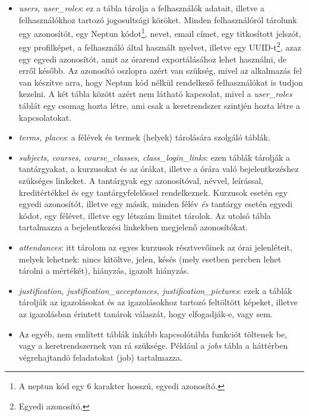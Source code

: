\documentclass[
]{thesis-ekf}
\theoremstyle{definition}
\theoremstyle{remark}
\begin{document}
\begin{itemize}
	\item \emph{users, user\_roles}: ez a tábla tárolja a felhasználók adatait, illetve a felhasználókhoz tartozó jogosultsági köröket. Minden felhasználóról tárolunk egy azonosítót, egy Neptun\cite{Neptun} kódot\footnote{A neptun kód egy 6 karakter hosszú, egyedi azonosító.}, nevet, email címet, egy titkosított jelszót, egy profilképet, a felhasználó által használt nyelvet, illetve egy UUID-t\footnote{Egyedi azonosító.\cite{uuid}}, azaz egy egyedi azonosítót, amit az órarend exportálásához lehet használni, de erről később. Az azonosító oszlopra azért van szükség, mivel az alkalmazás fel van készítve arra, hogy Neptun kód nélkül rendelkező felhasználókat is tudjon kezelni. A két tábla között azért nem látható kapcsolat, mivel a \emph{user\_roles} táblát egy csomag hozta létre, ami csak a keretrendszer szintjén hozta létre a kapcsolatokat.
	
	\item \emph{terms, places}: a félévek és termek (helyek) tárolására szolgáló táblák.
	
	\item \emph{subjects, courses, course\_classes, class\_login\_links}: ezen táblák tárolják a tantárgyakat, a kurzusokat és az órákat, illetve a órára való bejelentkezéshez szükséges linkeket. A tantárgyak egy azonosítóval, névvel, leírással, kreditértékkel és egy tantárgyfelelőssel rendelkeznek. Kurzusok esetén egy egyedi azonosítót, illetve egy másik, minden félév \emph{és} tantárgy esetén egyedi kódot, egy félévet, illetve egy létszám limitet tárolok. Az utolsó tábla tartalmazza a bejelentkezési linkekben megjelenő azonosítókat.
	
	\item  \emph{attendances}: itt tárolom az egyes kurzusok résztvevőinek az órai jelenléteit, melyek lehetnek: nincs kitöltve, jelen, késés (mely esetben percben lehet tárolni a mértékét), hiányzás, igazolt hiányzás.
	
	\item \emph{justification, justification\_acceptances, justification\_pictures}: ezek a táblák tárolják az igazolásokat és az igazolásokhoz tartozó feltöltött képeket, illetve az igazolásban érintett tanárok válaszát, hogy elfogadják-e, vagy sem.
	
	\item Az egyéb, nem említett táblák inkább kapcsolótábla funkciót töltenek be, vagy a keretrendszernek van rá szüksége. Például a \emph{jobs} tábla a háttérben végrehajtandó feladatokat (job) tartalmazza.
\end{itemize}
\end{document}

